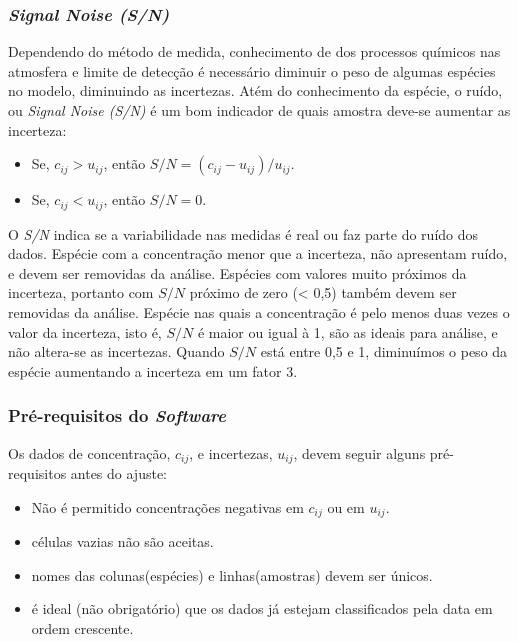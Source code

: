 \subsubsection{\textit{Signal Noise (S/N)}}
Dependendo do método de medida, conhecimento de dos processos químicos nas atmosfera e limite de detecção é necessário diminuir o peso de algumas espécies no modelo, diminuindo as incertezas. Atém do conhecimento da espécie, o ruído, ou \textit{Signal Noise (S/N)} é um bom indicador de quais amostra deve-se aumentar as incerteza:
\begin{itemize}
  \item Se, $c_{ij} >  u_{ij}$, então $ S/N = (c_{ij} - u_{ij})/u_{ij}$.
  \item Se, $c_{ij} <  u_{ij}$, então $S/N = 0 $.
\end{itemize}
O \textit{S/N} indica se a variabilidade nas medidas é real ou faz parte do ruído dos dados. Espécie com a concentração menor que a incerteza, não apresentam ruído, e devem ser removidas da análise. Espécies com valores muito próximos da incerteza, portanto com $S/N$ próximo de zero (< 0,5) também devem ser removidas da análise. Espécie nas quais a concentração é pelo menos duas vezes o valor da incerteza, isto é, $S/N$ é maior ou igual à 1, são as ideais para análise, e não altera-se as incertezas. Quando $S/N$ está entre 0,5 e 1, diminuímos o peso da espécie aumentando a incerteza em um fator 3.  

\subsubsection{Pré-requisitos do \textit{Software}}
Os dados de concentração, $c_{ij}$, e incertezas, $u_{ij}$, devem seguir alguns pré-requisitos antes do ajuste:
\begin{itemize}
  \item Não é permitido concentrações negativas em $c_{ij}$ ou em $u_{ij}$.
  \item células vazias não são aceitas.
  \item nomes das colunas(espécies) e linhas(amostras) devem ser únicos.
  \item é ideal (não obrigatório) que os dados já estejam classificados pela data em ordem crescente.
\end{itemize}

